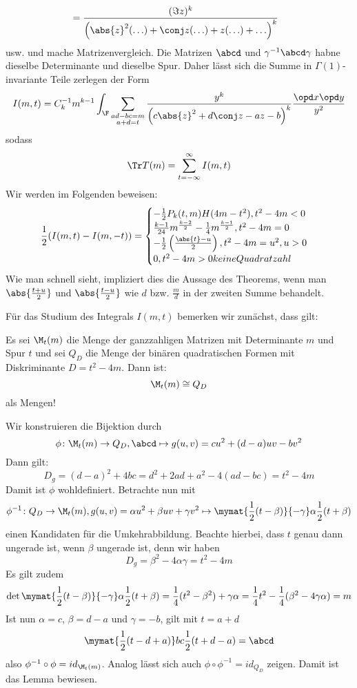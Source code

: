 \begin{bewe}
\begin{align*}
	&= \frac {(\Im z)^k} {\left( \abs{z}^2 (\ldots) + \conj z (\ldots) + z (\ldots) + \ldots \right)^k}
\end{align*}
usw. und mache Matrizenvergleich. Die Matrizen $\abcd$ und $\gamma^{-1} \abcd \gamma$ habne dieselbe Determinante und dieselbe Spur. Daher lässt sich die Summe in $\Gamma(1)$-invariante Teile zerlegen der Form
\[
	I(m,t) = C_k^{-1} m^{k-1} \int_\F \sum_{\substack{ad-bc = m\\a+d = t}} \frac{y^k}{\left(c \abs{z}^2 + d \conj z - az - b\right)^k} \frac{\opd x \opd y}{y^2}
\]
sodass
\[
	\Tr T(m) = \sum_{t = -\infty}^\infty I(m,t)
\]
Wir werden im Folgenden beweisen:
\[
\frac 12 (I(m,t) - I(m, -t)) = \begin{cases}
- \frac 12 P_k(t,m) H(4m - t^2), t^2 - 4m < 0 \\ \frac{k-1}{24} m^{\frac {k-2}2} - \frac 14 m^{\frac {k-1}2}, t^2 - 4m = 0 \\ - \frac 12 \left( \frac{\abs{t} - u}2 \right), t^2 - 4m = u^2, u > 0 \\ 0, t^2 - 4m > 0 keine Quadratzahl
\end{cases}
\]
Wie man schnell sieht, impliziert dies die Aussage des Theorems, wenn man $\abs {\frac {t+u}2}$ und $\abs {\frac {t-u}2}$ wie $d$ bzw. $\frac md$ in der zweiten Summe behandelt.

Für das Studium des Integrals $I(m,t)$ bemerken wir zunächst, dass gilt:

\begin{lemm}
Es sei $\M_t(m)$ die Menge der ganzzahligen Matrizen mit Determinante $m$ und Spur $t$ und sei $Q_D$ die Menge der binären quadratischen Formen mit Diskriminante $D = t^2 - 4m$. Dann ist:
\[
	\M_t (m) \cong Q_D
\]
als Mengen!
\end{lemm}

\begin{bewe}
Wir konstruieren die Bijektion durch
\[
	\phi \colon \M_t (m) \to Q_D, \abcd \mapsto g(u, v) = cu^2 + (d-a)uv - bv^2
\]
Dann gilt:
\[
	D_g = (d-a)^2 + 4bc = d^2 + 2ad + a^2 - 4(ad-bc) = t^2 - 4m
\]
Damit ist $\phi$ wohldefiniert. Betrachte nun mit
\[
	\phi^{-1} \colon Q_D \to \M_t (m), g(u, v) = \alpha u^2 + \beta uv + \gamma v^2 \mapsto \mymat {\frac 12 (t - \beta)} {-\gamma} \alpha {\frac 12(t + \beta)}
\]
einen Kandidaten für die Umkehrabbildung. Beachte hierbei, dass $t$ genau dann ungerade ist, wenn $\beta$ ungerade ist, denn wir haben
\[
	D_g = \beta^2 - 4\alpha \gamma = t^2 - 4m
\]
Es gilt zudem
\[
	\det \mymat {\frac 12 (t - \beta)} {-\gamma} \alpha {\frac 12(t + \beta)} = \frac 14 (t^2 - \beta^2) + \gamma \alpha = \frac 14 t^2 - \frac 14 (\beta^2 - 4\gamma \alpha) = m
\]
Ist nun $\alpha = c$, $\beta = d - a$ und $\gamma = -b$, gilt mit $t = a+d$
\[
	\mymat {\frac 12(t-d+a)} bc {\frac 12(t+d-a)} = \abcd
\]
also $\phi^{-1} \circ \phi = id_{\M_t(m)}$. Analog lässt sich auch $\phi \circ \phi^{-1} = id_{Q_D}$ zeigen. Damit ist das Lemma bewiesen.
\end{bewe}


\end{bewe}
